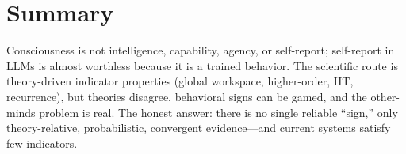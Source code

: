 \documentclass[11pt]{article}
\begin{document}
\section{Summary}
Consciousness is not intelligence, capability, agency, or self-report; self-report in LLMs is almost
worthless because it is a trained behavior. The scientific route is theory-driven indicator properties
(global workspace, higher-order, IIT, recurrence), but theories disagree, behavioral signs can be gamed,
and the other-minds problem is real. The honest answer: there is no single reliable ``sign,'' only
theory-relative, probabilistic, convergent evidence---and current systems satisfy few indicators.



\end{document}
